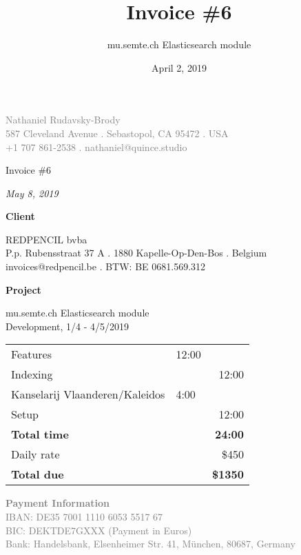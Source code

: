 \documentclass[11pt]{article}
\author{mu.semte.ch Elasticsearch module}
\date{April 2, 2019}
\title{Invoice \#6}
\begin{document}
 \thispagestyle{empty}
\centering

{\small\textcolor{gray}{
Nathaniel Rudavsky-Brody \\
587 Cleveland Avenue . Sebastopol, CA 95472 . USA\\
+1 707 861-2538  . nathaniel@quince.studio\\
}}

\vspace{4em}

{\Huge Invoice \#6}

\vspace{1em}

{\textit{May 8, 2019}}

\vspace{1em}

{\Large\textbf{Client}}

REDPENCIL bvba\\
P.p. Rubensstraat 37 A . 1880 Kapelle-Op-Den-Bos . Belgium\\
invoices@redpencil.be . BTW: BE 0681.569.312

\vspace{1em}

{\Large\textbf{Project}}

 mu.semte.ch Elasticsearch module\\
 Development, 1/4 - 4/5/2019

\vspace{1em}



\begin{table}[htb]
\centering

\begin{tabular}{llr}


\hline


\hline


\hline
Features & 12:00 & \\
\hspace*{1em} Indexing &  & 12:00\\
Kanselarij Vlaanderen/Kaleidos
 & 4:00 & \\
\hspace*{1em} Setup &  & 12:00\\
\hline
\textbf{Total time} & & \textbf{	24:00} \\

Daily rate & & \$450 \\

\textbf{Total due} & & \textbf{\$1350} \\
\end{tabular}
\end{table}

\vspace{\fill}



\textcolor{gray}{\small
\textbf{Payment Information}\\
IBAN: DE35 7001 1110 6053 5517 67 \\
BIC: DEKTDE7GXXX  (Payment in Euros) \\
Bank: Handelsbank, Elsenheimer Str. 41, München, 80687, Germany
}
\end{document}
